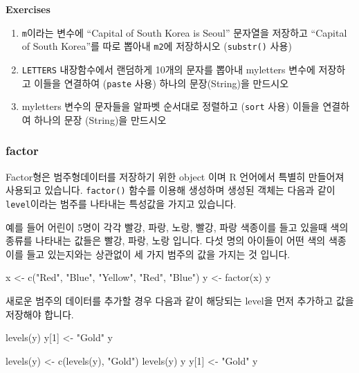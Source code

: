 \documentclass[
]{book}
\newenvironment{Shaded}{\begin{snugshade}}{\end{snugshade}}
\newcommand{\DecValTok}[1]{\textcolor[rgb]{0.00,0.00,0.81}{#1}}
\newcommand{\FunctionTok}[1]{\textcolor[rgb]{0.00,0.00,0.00}{#1}}
\newcommand{\NormalTok}[1]{#1}
\newcommand{\OtherTok}[1]{\textcolor[rgb]{0.56,0.35,0.01}{#1}}
\newcommand{\StringTok}[1]{\textcolor[rgb]{0.31,0.60,0.02}{#1}}
\begin{document}
\textbf{Exercises}

\begin{enumerate}
\def\labelenumi{\arabic{enumi}.}
\item
  \texttt{m}이라는 변수에 ``Capital of South Korea is Seoul'' 문자열을 저장하고 ``Capital of South Korea''를 따로 뽑아내 \texttt{m2}에 저장하시오 (\texttt{substr()} 사용)
\item
  \texttt{LETTERS} 내장함수에서 랜덤하게 10개의 문자를 뽑아내 myletters 변수에 저장하고 이들을 연결하여 (\texttt{paste} 사용) 하나의 문장(String)을 만드시오
\item
  myletters 변수의 문자들을 알파벳 순서대로 정렬하고 (\texttt{sort} 사용) 이들을 연결하여 하나의 문장 (String)을 만드시오
\end{enumerate}

\hypertarget{factor}{%
\subsubsection{factor}\label{factor}}

Factor형은 범주형데이터를 저장하기 위한 object 이며 R 언어에서 특별히 만들어져 사용되고 있습니다. \texttt{factor()} 함수를 이용해 생성하며 생성된 객체는 다음과 같이 \texttt{level}이라는 범주를 나타내는 특성값을 가지고 있습니다.

예를 들어 어린이 5명이 각각 빨강, 파랑, 노랑, 빨강, 파랑 색종이를 들고 있을때 색의 종류를 나타내는 값들은 빨강, 파랑, 노랑 입니다. 다섯 명의 아이들이 어떤 색의 색종이를 들고 있는지와는 상관없이 세 가지 범주의 값을 가지는 것 입니다.

\begin{Shaded}
\begin{Highlighting}[]
\NormalTok{x }\OtherTok{\textless{}{-}} \FunctionTok{c}\NormalTok{(}\StringTok{"Red"}\NormalTok{, }\StringTok{"Blue"}\NormalTok{, }\StringTok{"Yellow"}\NormalTok{, }\StringTok{"Red"}\NormalTok{, }\StringTok{"Blue"}\NormalTok{)}
\NormalTok{y }\OtherTok{\textless{}{-}} \FunctionTok{factor}\NormalTok{(x)}
\NormalTok{y}
\end{Highlighting}
\end{Shaded}

새로운 범주의 데이터를 추가할 경우 다음과 같이 해당되는 level을 먼저 추가하고 값을 저장해야 합니다.

\begin{Shaded}
\begin{Highlighting}[]
\FunctionTok{levels}\NormalTok{(y)}
\NormalTok{y[}\DecValTok{1}\NormalTok{] }\OtherTok{\textless{}{-}} \StringTok{"Gold"}
\NormalTok{y}

\FunctionTok{levels}\NormalTok{(y) }\OtherTok{\textless{}{-}} \FunctionTok{c}\NormalTok{(}\FunctionTok{levels}\NormalTok{(y), }\StringTok{"Gold"}\NormalTok{)}
\FunctionTok{levels}\NormalTok{(y)}
\NormalTok{y}
\NormalTok{y[}\DecValTok{1}\NormalTok{] }\OtherTok{\textless{}{-}} \StringTok{"Gold"}
\NormalTok{y}
\end{Highlighting}
\end{Shaded}
\end{document}
